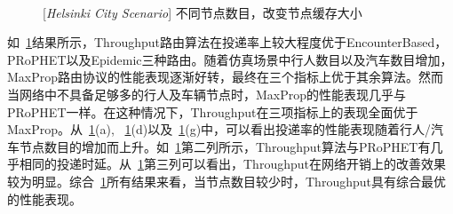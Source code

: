 \begin{figure}[htbp]
\\
\caption{[\emph{Helsinki City Scenario}] 不同节点数目，改变节点缓存大小}
\label{fig:chap4_helsinki_buffer}
\end{figure}

如\figurename~\ref{fig:chap4_helsinki_buffer}结果所示，Throughput路由算法在投递率上较大程度优于EncounterBased，PRoPHET以及Epidemic三种路由。随着仿真场景中行人数目以及汽车数目增加，MaxProp路由协议的性能表现逐渐好转，最终在三个指标上优于其余算法。然而当网络中不具备足够多的行人及车辆节点时，MaxProp的性能表现几乎与PRoPHET一样。在这种情况下，Throughput在三项指标上的表现全面优于MaxProp。从\figurename~\ref{fig:chap4_helsinki_buffer}(a), \figurename~\ref{fig:chap4_helsinki_buffer}(d)以及\figurename~\ref{fig:chap4_helsinki_buffer}(g)中，可以看出投递率的性能表现随着行人/汽车节点数目的增加而上升。如\figurename~\ref{fig:chap4_helsinki_buffer}第二列所示，Throughput算法与PRoPHET有几乎相同的投递时延。从\figurename~\ref{fig:chap4_helsinki_buffer}第三列可以看出，Throughput在网络开销上的改善效果较为明显。综合\figurename~\ref{fig:chap4_helsinki_buffer}所有结果来看，当节点数目较少时，Throughput具有综合最优的性能表现。

